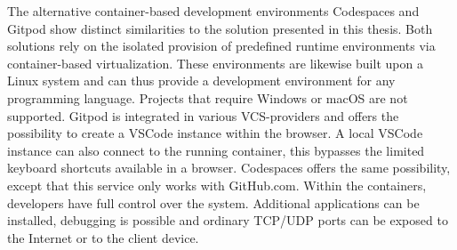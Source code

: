 The alternative container-based development environments Codespaces and Gitpod show distinct similarities to the solution presented in this thesis. Both solutions rely on the isolated provision of predefined runtime environments via container-based virtualization. These environments are likewise built upon a Linux system and can thus provide a development environment for any programming language. Projects that require Windows or macOS are not supported.\newline
Gitpod is integrated in various \ac{VCS}-providers and offers the possibility to create a \ac{VSCode} instance within the browser. A local \ac{VSCode} instance can also connect to the running container, this bypasses the limited keyboard shortcuts available in a browser. Codespaces offers the same possibility, except that this service only works with GitHub.com. Within the containers, developers have full control over the system. Additional applications can be installed, debugging is possible and ordinary TCP/UDP ports can be exposed to the Internet or to the client device.\newline
